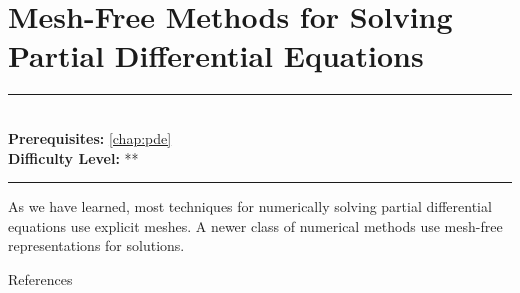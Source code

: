 \documentclass[book.tex]{subfiles}
\begin{document}
\chapter{Mesh-Free Methods for Solving Partial Differential Equations}


\label{chap:mesh_free}
\noindent\rule{11cm}{0.4pt} \\
\textbf{Prerequisites:} \autoref{chap:pde} \\
\textbf{Difficulty Level:} ** \\
\noindent\rule{11cm}{0.4pt}
\vspace{5mm}

As we have learned, most techniques for numerically solving partial differential equations use explicit meshes. A newer class of numerical methods use mesh-free representations for solutions.

References \cite{fasshauer2006meshfree}
\end{document}
